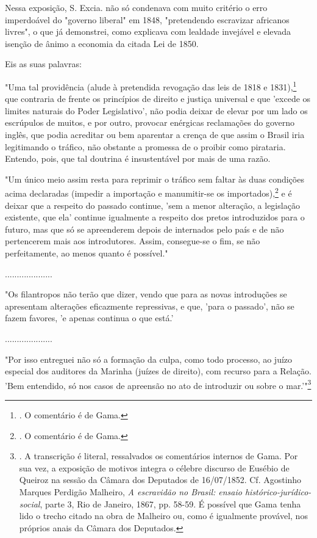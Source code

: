 Nessa exposição, S. Excia. não só condenava com muito critério o erro
imperdoável do "governo liberal" em 1848, "pretendendo escravizar
africanos livres", o que já demonstrei, como explicava com lealdade
invejável e elevada isenção de ânimo a economia da citada Lei de 1850.

Eis as suas palavras:

"Uma tal providência (alude à pretendida revogação das leis de 1818 e
1831),\footnote{. O comentário é de Gama.} que contraria de frente os
princípios de direito e justiça universal e que 'excede os limites
naturais do Poder Legislativo', não podia deixar de elevar por um lado
os escrúpulos de muitos, e por outro, provocar enérgicas reclamações do
governo inglês, que podia acreditar ou bem aparentar a crença de que
assim o Brasil iria legitimando o tráfico, não obstante a promessa de o
proibir como pirataria. Entendo, pois, que tal doutrina é insustentável
por mais de uma razão.

"Um único meio assim resta para reprimir o tráfico sem faltar às duas
condições acima declaradas (impedir a importação e manumitir-se os
importados),\footnote{. O comentário é de Gama.} e é deixar que a
respeito do passado continue, 'sem a menor alteração, a legislação
existente, que ela' continue igualmente a respeito dos pretos
introduzidos para o futuro, mas que só se apreenderem depois de
internados pelo país e de não pertencerem mais aos introdutores. Assim,
consegue-se o fim, se não perfeitamente, ao menos quanto é possível."

....................

"Os filantropos não terão que dizer, vendo que para as novas introduções
se apresentam alterações eficazmente repressivas, e que, 'para o
passado', não se fazem favores, 'e apenas continua o que está.'

....................

"Por isso entreguei não só a formação da culpa, como todo processo, ao
juízo especial dos auditores da Marinha (juízes de direito), com recurso
para a Relação. 'Bem entendido, só nos casos de apreensão no ato de
introduzir ou sobre o mar.'"\footnote{. A transcrição é literal,
  ressalvados os comentários internos de Gama. Por sua vez, a exposição
  de motivos integra o célebre discurso de Eusébio de Queiroz na sessão
  da Câmara dos Deputados de 16/07/1852. Cf. Agostinho Marques Perdigão
  Malheiro, \emph{A escravidão no Brasil: ensaio
  histórico-jurídico-social}, parte 3, Rio de Janeiro, 1867, pp. 58-59.
  É possível que Gama tenha lido o trecho citado na obra de Malheiro ou,
  como é igualmente provável, nos próprios anais da Câmara dos
  Deputados.}

